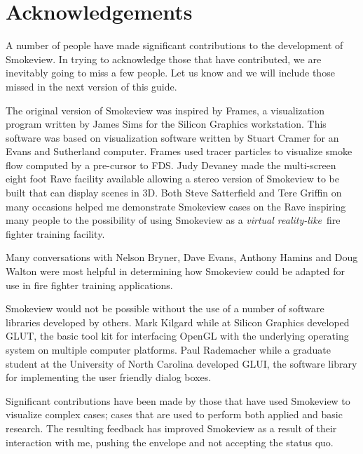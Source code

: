 \documentclass[11pt,twoside]{book}
\begin{document}

\chapter*{Acknowledgements}
A number of people have made significant contributions to the
development of Smokeview. In trying to acknowledge those that have
contributed, we are inevitably going to miss a few people.  Let us
know and we will include those missed in the next version of this
guide.

The original version of Smokeview was inspired by Frames, a
visualization program written by James Sims for the Silicon
Graphics workstation.  This software was based on visualization
software written by Stuart Cramer for an Evans and Sutherland
computer. Frames used tracer particles to visualize smoke flow
computed by a pre-cursor to FDS. Judy Devaney made the
multi-screen eight foot Rave facility available allowing a stereo
version of Smokeview to be built that can display scenes in
3D.  Both Steve Satterfield and Tere Griffin on many occasions
helped me demonstrate Smokeview cases on the Rave inspiring many
people to the possibility of using Smokeview as a {\em virtual
reality-like}\ fire fighter training facility.

Many conversations with Nelson Bryner, Dave Evans, Anthony Hamins
and Doug Walton were most helpful in determining how Smokeview
could be adapted for use in fire fighter training applications.

Smokeview would not be possible without the use of a number of
software libraries developed by others.  Mark Kilgard while at
Silicon Graphics developed GLUT, the basic tool kit for
interfacing OpenGL with the underlying operating system on
multiple computer platforms. Paul Rademacher while a graduate
student at the University of North Carolina developed GLUI, the
software library for implementing the user friendly dialog boxes.

Significant contributions have been made by those that have used
Smokeview to visualize complex cases; cases that are used to
perform both applied and basic research.  The resulting feedback
has improved Smokeview as a result of their interaction with me,
pushing the envelope and not accepting the status quo.
\end{document}
